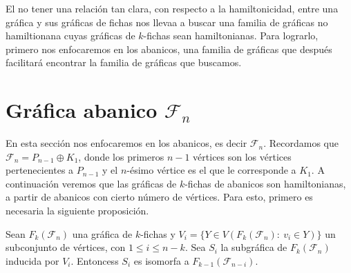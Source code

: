 El no tener una relaci\'on tan clara, con respecto a la hamiltonicidad, entre
una gr\'afica y sus gr\'aficas de fichas nos llevaa a buscar una familia de
gr\'aficas no hamiltionana cuyas gr\'aficas de $k$-fichas sean hamiltonianas.
Para lograrlo, primero nos enfocaremos en los abanicos, una familia de
gr\'aficas que despu\'es facilitar\'a encontrar la familia de gr\'aficas que
buscamos.

\section{Gr\'afica abanico \texorpdfstring{$\mathcal{F}_n$}{Fn}}%
\label{sec:SimpleFan}

En esta secci\'on nos enfocaremos en los abanicos, es decir $\mathcal{F}_n$.
Recordamos que $\mathcal{F}_n = P_{n-1} \oplus K_1$, donde los primeros $n-1$
v\'ertices son los v\'ertices pertenecientes a $P_{n-1}$ y el $n$-\'esimo
v\'ertice es el que le corresponde a $K_1$. A continuaci\'on veremos que las
gr\'aficas de $k$-fichas de abanicos son hamiltonianas, a partir de abanicos con
cierto n\'umero de v\'ertices. Para esto, primero es necesaria la siguiente
proposici\'on.




\begin{proposicion}
        \label{prop:iso-SFan}
            Sean $F_k(\mathcal{F}_n)$ una gr\'afica de $k$-fichas y $V_i=\{ Y \in
            V(F_k(\mathcal{F}_n) \colon\ v_i \in Y) \}$ un subconjunto de v\'ertices, con
            $1 \leq i \leq n-k$. Sea $S_i$ la subgr\'afica de $F_k(\mathcal{F}_n)$
            inducida  por $V_i$. Entoncess $S_i$ es isomorfa a
            $F_{k-1}(\mathcal{F}_{n-i})$.
        \end{proposicion}
    
